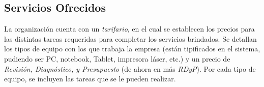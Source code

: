 \documentclass[12pt]{extarticle}
\begin{document}
\begin{spacing}{1.2}









    \pagebreak


    \subsection{Servicios Ofrecidos}
    La organización cuenta con un \textit{tarifario}, en el cual se establecen los precios para las distintas tareas requeridas para completar los servicios brindados. Se detallan los tipos de equipo con los que trabaja la empresa (están tipificados en el sistema, pudiendo ser PC, notebook, Tablet, impresora láser, etc.) y un precio de \textit{Revisión, Diagnóstico, y Presupuesto} (de ahora en más \textit{RDyP}). Por cada tipo de equipo, se incluyen las tareas que se le pueden realizar.


\end{spacing}
\end{document}
